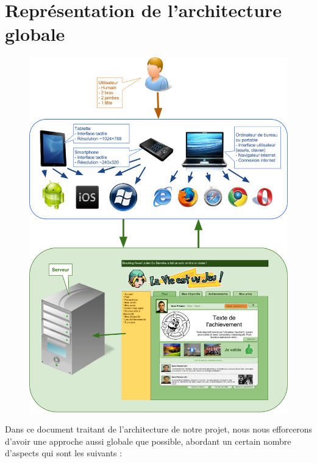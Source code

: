 \documentclass{life-fr}
\begin{document}

\chapter{Représentation de l’architecture globale}

\begin{figure}[H]
  \begin{center}
    \includegraphics[width=11.5cm]{img/intro.png}
  \end{center}
\end{figure}

\newpage
 
  Dans ce document traitant de l'architecture de notre projet, nous nous efforcerons d'avoir une approche aussi globale que possible, abordant un certain nombre d’aspects qui sont les suivants :
\end{document}
